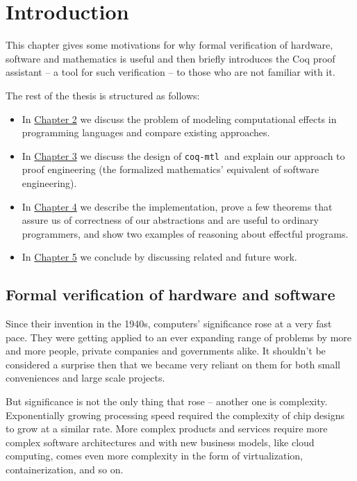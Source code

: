 \documentclass[declaration,inz,english,shortabstract]{iithesis}
\author         {Wojciech Kołowski}
\date           {10 września 2019}                     %
\newcommand{\libname}{\m{coq-mtl}}
\newcommand{\m}[1]{\texttt{#1}}
\begin{document}

\chapter{Introduction} \label{ch1}

This chapter gives some motivations for why formal verification of hardware, software and mathematics is useful and then briefly introduces the Coq proof assistant -- a tool for such verification -- to those who are not familiar with it.

The rest of the thesis is structured as follows:

\begin{itemize}
    \item In \hyperref[ch2]{Chapter 2} we discuss the problem of modeling computational effects in programming languages and compare existing approaches.
    \item In \hyperref[ch3]{Chapter 3} we discuss the design of \libname\ and explain our approach to proof engineering (the formalized mathematics' equivalent of software engineering).
    \item In \hyperref[ch4]{Chapter 4} we describe the implementation, prove a few theorems that assure us of correctness of our abstractions and are useful to ordinary programmers, and show two examples of reasoning about effectful programs.
    \item In \hyperref[ch5]{Chapter 5} we conclude by discussing related and future work.
\end{itemize}

\section{Formal verification of hardware and software}

Since their invention in the 1940s, computers' significance rose at a very fast pace. They were getting applied to an ever expanding range of problems by more and more people, private companies and governments alike. It shouldn't be considered a surprise then that we became very reliant on them for both small conveniences and large scale projects.

But significance is not the only thing that rose -- another one is complexity. Exponentially growing processing speed required the complexity of chip designs to grow at a similar rate. More complex products and services require more complex software architectures and with new business models, like cloud computing, comes even more complexity in the form of virtualization, containerization, and so on.
\end{document}
